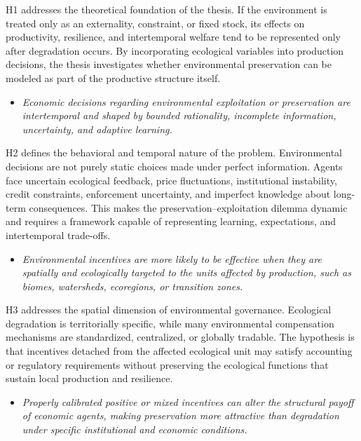 H1 addresses the theoretical foundation of the thesis. If the environment is treated only as an externality, constraint, or fixed stock, its effects on productivity, resilience, and intertemporal welfare tend to be represented only after degradation occurs. By incorporating ecological variables into production decisions, the thesis investigates whether environmental preservation can be modeled as part of the productive structure itself.

\begin{itemize}

    \item[\textbf{H2.}]
    
    \textit{Economic decisions regarding environmental exploitation or preservation are intertemporal and shaped by bounded rationality, incomplete information, uncertainty, and adaptive learning.}

\end{itemize}

H2 defines the behavioral and temporal nature of the problem. Environmental decisions are not purely static choices made under perfect information. Agents face uncertain ecological feedback, price fluctuations, institutional instability, credit constraints, enforcement uncertainty, and imperfect knowledge about long-term consequences. This makes the preservation--exploitation dilemma dynamic and requires a framework capable of representing learning, expectations, and intertemporal trade-offs.

\begin{itemize}

    \item[\textbf{H3.}]
    
    \textit{Environmental incentives are more likely to be effective when they are spatially and ecologically targeted to the units affected by production, such as biomes, watersheds, ecoregions, or transition zones.}

\end{itemize}

H3 addresses the spatial dimension of environmental governance. Ecological degradation is territorially specific, while many environmental compensation mechanisms are standardized, centralized, or globally tradable. The hypothesis is that incentives detached from the affected ecological unit may satisfy accounting or regulatory requirements without preserving the ecological functions that sustain local production and resilience.

\begin{itemize}

    \item[\textbf{H4.}]
    
    \textit{Properly calibrated positive or mixed incentives can alter the structural payoff of economic agents, making preservation more attractive than degradation under specific institutional and economic conditions.}

\end{itemize}

